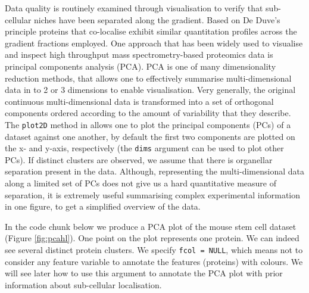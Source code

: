 Data quality is routinely examined through visualisation to verify
that sub-cellular niches have been separated along the gradient. Based
on De Duve's principle \cite{DeDuve:1981} proteins that co-localise
exhibit similar quantitation profiles across the gradient fractions
employed. One approach that has been widely used to visualise and
inspect high throughput mass spectrometry-based proteomics data is
principal components analysis (PCA). PCA is one of many dimensionality
reduction methods, that allows one to effectively summarise
multi-dimensional data in to 2 or 3 dimensions to enable
visualisation. Very generally, the original continuous
multi-dimensional data is transformed into a set of orthogonal
components ordered according to the amount of variability that they
describe. The \texttt{plot2D} method in  allows one to
plot the principal components (PCs) of a dataset against one another,
by default the first two components are plotted on the x- and y-axis,
respectively (the \texttt{dims} argument can be used to plot other PCs). If
distinct clusters are observed, we assume that there is organellar
separation present in the data. Although, representing the
multi-dimensional data along a limited set of PCs does not give us a
hard quantitative measure of separation, it is extremely useful
summarising complex experimental information in one figure, to get a
simplified overview of the data.

In the code chunk below we produce a PCA plot of the mouse stem cell
dataset (Figure \ref{fig:pcahl}). One point on the plot represents one
protein. We can indeed see several distinct protein clusters. We
specify \texttt{fcol = NULL}, which means not to consider any feature
variable to annotate the features (proteins) with colours. We will see
later how to use this argument to annotate the PCA plot with prior information
about sub-cellular localisation.

